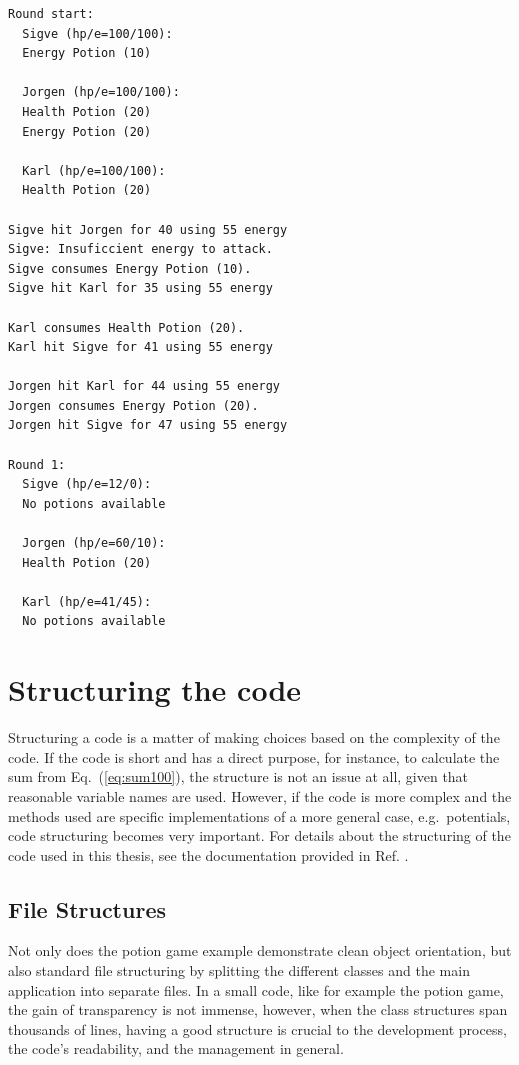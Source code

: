 \clearpage


\scriptsize
\begin{verbatim}
Round start: 
  Sigve (hp/e=100/100):
  Energy Potion (10)

  Jorgen (hp/e=100/100):
  Health Potion (20)
  Energy Potion (20)

  Karl (hp/e=100/100):
  Health Potion (20)

Sigve hit Jorgen for 40 using 55 energy
Sigve: Insuficcient energy to attack.
Sigve consumes Energy Potion (10).
Sigve hit Karl for 35 using 55 energy

Karl consumes Health Potion (20).
Karl hit Sigve for 41 using 55 energy

Jorgen hit Karl for 44 using 55 energy
Jorgen consumes Energy Potion (20).
Jorgen hit Sigve for 47 using 55 energy

Round 1: 
  Sigve (hp/e=12/0):
  No potions available

  Jorgen (hp/e=60/10):
  Health Potion (20)

  Karl (hp/e=41/45):
  No potions available
\end{verbatim}
\clearpage
\normalsize

\section{Structuring the code}

Structuring a code is a matter of making choices based on the complexity of the code. If the code is short and has a direct purpose, for instance, to calculate the sum from Eq.~(\ref{eq:sum100}), the structure is not an issue at all, given that reasonable variable names are used. However, if the code is more complex and the methods used are specific implementations of a more general case, e.g.~potentials, code structuring becomes very important. For details about the structuring of the code used in this thesis, see the documentation provided in Ref. \cite{libBorealisCode}. 

\subsection{File Structures}

Not only does the potion game example demonstrate clean object orientation, but also standard file structuring by splitting the different classes and the main application into separate files. In a small code, like for example the potion game, the gain of transparency is not immense, however, when the class structures span thousands of lines, having a good structure is crucial to the development process, the code's readability, and the management in general.

